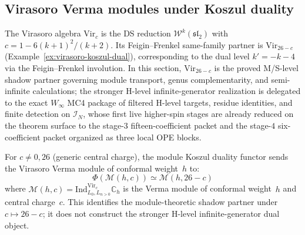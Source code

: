 \subsection{Virasoro Verma modules under Koszul duality}
\label{sec:virasoro-verma-koszul}

The Virasoro algebra $\mathrm{Vir}_c$ is the DS reduction
$\mathcal{W}^k(\mathfrak{sl}_2)$ with $c = 1 - 6(k+1)^2/(k+2)$.
Its Feigin--Frenkel same-family partner is $\mathrm{Vir}_{26-c}$
(Example~\ref{ex:virasoro-koszul-dual}), corresponding to the
dual level $k' = -k-4$ via the Feigin--Frenkel involution.
In this section, $\mathrm{Vir}_{26-c}$ is the proved M/S-level shadow
partner governing module transport, genus complementarity, and
semi-infinite calculations; the stronger H-level infinite-generator
realization is delegated to the exact $W_\infty$ MC4 package of
filtered H-level targets, residue identities, and finite detection on
$\mathcal{I}_N$, whose first live higher-spin stages are already
reduced on the theorem surface to the stage-$3$ fifteen-coefficient
packet and the stage-$4$ six-coefficient packet organized as three
local OPE blocks.

\begin{proposition}
\label{prop:virasoro-verma-koszul}
For $c \neq 0, 26$ (generic central charge), the module Koszul
duality functor sends the Virasoro Verma module of conformal
weight~$h$ to:
\begin{equation}\label{eq:virasoro-verma-koszul}
\Phi(\mathcal{M}(h, c)) \simeq \mathcal{M}(h, 26-c)
\end{equation}
where $\mathcal{M}(h, c) = \mathrm{Ind}_{L_0, L_{n>0}}^{\mathrm{Vir}_c}
\mathbb{C}_h$ is the Verma module of conformal weight~$h$ and
central charge~$c$.  This identifies the module-theoretic shadow
partner under $c \mapsto 26-c$; it does not construct the stronger
H-level infinite-generator dual object.
\end{proposition}

